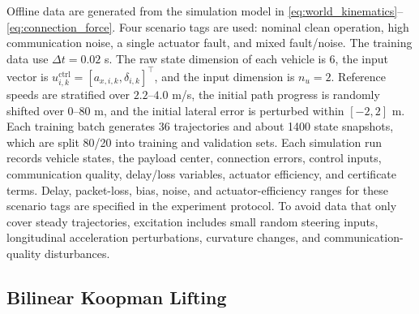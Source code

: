 \documentclass[twocolumn,3p,times,procedia]{elsarticle}
\begin{document}
Offline data are generated from the simulation model in \eqref{eq:world_kinematics}--\eqref{eq:connection_force}. Four scenario tags are used: nominal clean operation, high communication noise, a single actuator fault, and mixed fault/noise. The training data use $\Delta t=0.02$ s. The raw state dimension of each vehicle is $6$, the input vector is $u_{i,k}^{\mathrm{ctrl}}=[a_{x,i,k},\delta_{i,k}]^\top$, and the input dimension is $n_u=2$. Reference speeds are stratified over $2.2$--$4.0$ m/s, the initial path progress is randomly shifted over $0$--$80$ m, and the initial lateral error is perturbed within $[-2,2]$ m. Each training batch generates 36 trajectories and about 1400 state snapshots, which are split 80/20 into training and validation sets. Each simulation run records vehicle states, the payload center, connection errors, control inputs, communication quality, delay/loss variables, actuator efficiency, and certificate terms. Delay, packet-loss, bias, noise, and actuator-efficiency ranges for these scenario tags are specified in the experiment protocol. To avoid data that only cover steady trajectories, excitation includes small random steering inputs, longitudinal acceleration perturbations, curvature changes, and communication-quality disturbances.

\subsection{Bilinear Koopman Lifting}
\end{document}
